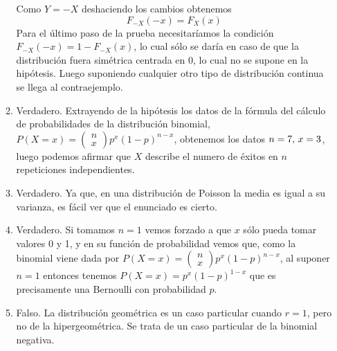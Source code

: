 \documentclass[fleqn]{article}
\begin{document}
\begin{enumerate}
\begin{enumerate}
                                        Como $Y=-X$ deshaciendo los cambios obtenemos 
                                        $$F_{-X}(-x) = F_X(x)$$
                                        Para el último paso de la prueba necesitaríamos la condición $F_{-X}(-x) = 1 - F_{-X}(x)$, lo cual sólo se daría en caso de que la distribución
                                        fuera simétrica centrada en 0, lo cual no se supone en la hipótesis. Luego suponiendo cualquier otro tipo de distribución continua se llega al 
                                        contraejemplo.\\
                                \item Verdadero. Extrayendo de la hipótesis los datos de la fórmula del cálculo de probabilidades de la distribución binomial,
                                        $P(X=x) = \left(\begin{matrix} n \\ x \end{matrix}\right) p^x (1-p)^{n-x}$, obtenemos los datos $n=7, \thinspace x=3$, 
                                        luego podemos afirmar que $X$ describe el numero de éxitos en $n$ repeticiones independientes.\\
                                \item Verdadero. Ya que, en una distribución de Poisson la media es igual a su varianza, es fácil ver que el enunciado es cierto.\\
                                \item Verdadero. Si tomamos $n=1$ vemos forzado a que $x$ sólo pueda tomar valores 0 y 1, y en su función de probabilidad vemos que, como 
                                        la binomial viene dada por $P(X=x) = \left(\begin{matrix} n \\ x \end{matrix}\right) p^x (1-p)^{n-x}$, al suponer
                                        $n=1$ entonces tenemos $P(X=x) = p^x (1-p)^{1-x}$ que es precisamente una Bernoulli con probabilidad $p$.\\
                                \item Falso. La distribución geométrica es un caso particular cuando $r=1$, pero no de la hipergeométrica. Se trata de un caso particular
                                        de la binomial negativa.
                                
                        \end{enumerate}


\end{enumerate}
\end{document}
